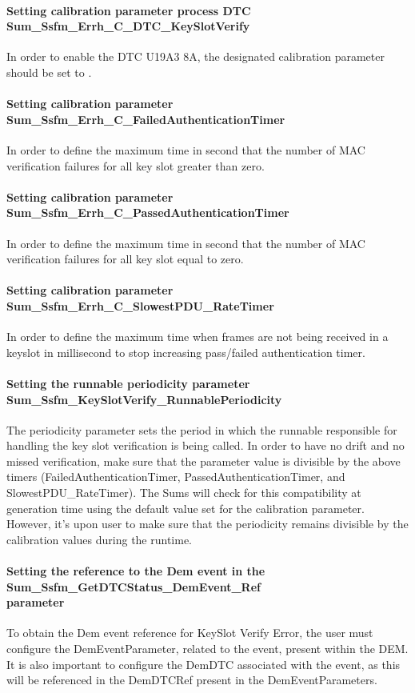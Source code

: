 \paragraph{Setting calibration parameter process DTC Sum\_Ssfm\_Errh\_C\_DTC\_KeySlotVerify}
In order to enable the DTC U19A3 8A, the designated calibration parameter should be set to .

\paragraph{Setting calibration parameter Sum\_Ssfm\_Errh\_C\_FailedAuthenticationTimer}
In order to define the maximum time in second that the number of MAC verification failures for all key slot greater than zero.

\paragraph{Setting calibration parameter Sum\_Ssfm\_Errh\_C\_PassedAuthenticationTimer}
In order to define the maximum time in second that the number of MAC verification failures for all key slot equal to zero.

\paragraph{Setting calibration parameter Sum\_Ssfm\_Errh\_C\_SlowestPDU\_RateTimer}
In order to define the maximum time when frames are not being received in a keyslot in millisecond to stop increasing pass/failed authentication timer.

\paragraph{Setting the runnable periodicity parameter Sum\_Ssfm\_KeySlotVerify\_RunnablePeriodicity}
The periodicity parameter sets the period in which the runnable responsible for handling the key slot verification is being called.
In order to have no drift and no missed verification, make sure that the parameter value is divisible by the above timers (FailedAuthenticationTimer, PassedAuthenticationTimer, and SlowestPDU\_RateTimer).
The Sums will check for this compatibility at generation time using the default value set for the calibration parameter. However, it's upon user to make sure that the periodicity remains divisible by the calibration values during the runtime.

\paragraph{Setting the reference to the Dem event in the Sum\_Ssfm\_GetDTCStatus\_DemEvent\_Ref \\parameter}
To obtain the Dem event reference for KeySlot Verify Error, the user must configure the DemEventParameter, related to the event, present within the DEM. It is also important to configure the DemDTC associated with the event, as this will be referenced in the DemDTCRef present in the DemEventParameters.

